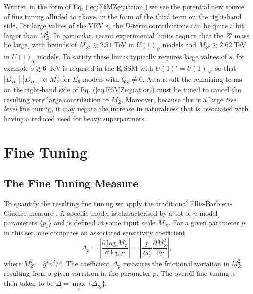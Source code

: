 \documentclass[preprint,amsmath,amssymb,aps,superscriptaddress,prd,showpacs,floatfix]{revtex4-1}
\begin{document}
Written in the form of Eq. (\ref{eq:E6MZequation}) we see the potential new source of fine tuning alluded to above, in the form of the third term on the right-hand side. For large values of the VEV $s$, the $D$-term contributions can be quite a bit larger than $M_Z^2$. In particular, recent experimental limits \cite{Aad:2014cka} require that the $Z'$ mass be large, with bounds of $M_{Z'}\gtrsim 2.51$ TeV in $U(1)_\psi$ models and $M_{Z'}\gtrsim 2.62$ TeV in $U(1)_\chi$ models. To satisfy these limits typically requires large values of $s$, for example $s\gtrsim 6$ TeV is required in the E$_6$SSM with $U(1)'=U(1)_N$, so that $|D_{H_u}|,|D_{H_d}|\gg M_Z^2$ for $E_6$ models with $\tilde{Q}_S\neq 0$. As a result the remaining terms on the right-hand side of Eq. (\ref{eq:E6MZequation}) must be tuned to cancel the resulting very large contribution to $M_Z$. Moreover, because this is a large \textit{tree level} fine tuning, it may negate the increase in naturalness that is associated with having a reduced need for heavy superpartners.
\section{\label{sec:tuning}Fine Tuning}
\subsection{\label{subsec:tuningmeasure}The Fine Tuning Measure}
To quantify the resulting fine tuning we apply the traditional Ellis-Barbieri-Giudice measure \cite{Ellis:1986yg,Barbieri:1987fn}. A specific model is characterised by a set of $n$ model parameters $\{p_i\}$ and is defined at some input scale $M_X$. For a given parameter $p$ in this set, one computes an associated sensitivity coefficient \cite{Feng:2013pwa}
\begin{equation}\label{eq:bgmeasure}
\Delta_p=\left | \frac{\partial \log M_Z^2}{\partial \log p}\right |=\left | \frac{p}{M_Z^2}\frac{\partial M_Z^2}{\partial p}\right |,
\end{equation}
where $M_Z^2=\bar{g}^2v^2/4$. The coefficient $\Delta_p$ measures the fractional variation in $M_Z^2$ resulting from a given variation in the parameter $p$. The overall fine tuning is then taken to be $\Delta = \underset{i}{\max}\,\{\Delta_{p_i}\}$.\\ \\
\end{document}
